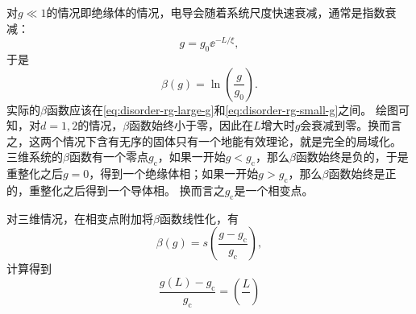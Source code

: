 对$g \ll 1$的情况即绝缘体的情况，电导会随着系统尺度快速衰减，通常是指数衰减：
\[
    g = g_0 \ee^{- L / \xi},
\]
于是
\begin{equation}
    \beta(g) = \ln(\frac{g}{g_0}).
    \label{eq:disorder-rg-small-g}
\end{equation}
实际的$\beta$函数应该在\eqref{eq:disorder-rg-large-g}和\eqref{eq:disorder-rg-small-g}之间。
绘图可知，对$d=1, 2$的情况，$\beta$函数始终小于零，因此在$L$增大时$g$会衰减到零。换而言之，这两个情况下含有无序的固体只有一个地能有效理论，就是完全的局域化。
三维系统的$\beta$函数有一个零点$g_\text{c}$，如果一开始$g < g_\text{c}$，那么$\beta$函数始终是负的，于是重整化之后$g=0$，得到一个绝缘体相；如果一开始$g > g_\text{c}$，那么$\beta$函数始终是正的，重整化之后得到一个导体相。
换而言之$g_\text{c}$是一个相变点。

对三维情况，在相变点附加将$\beta$函数线性化，有
\begin{equation}
    \beta(g) = s \left( \frac{g - g_\text{c}}{g_\text{c}} \right),
\end{equation}
计算得到
\begin{equation}
    \frac{g(L) - g_\text{c}}{g_\text{c}} = \left( \frac{L}{} \right)
\end{equation}
